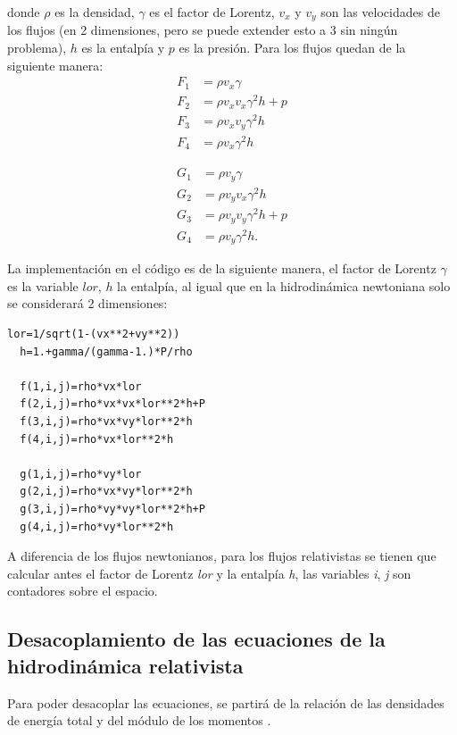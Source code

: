 \documentclass[12pt,a4paper]{book}
\begin{document}
\noindent donde $\rho$ es la densidad, $\gamma$ es el factor de Lorentz, $v_{x}$ y $v_{y}$ son las velocidades de los flujos (en 2 dimensiones, pero se puede extender esto a 3 sin ningún problema), 
$h$ es la entalpía  y $p$ es la presión. Para los flujos quedan de la siguiente manera:
\begin{align}
F_{1}& = \rho v_{x} \gamma \\ 
F_{2}& = \rho v_{x} v_{x} \gamma^{2} h + p\\ 
F_{3}& = \rho v_{x} v_{y} \gamma^{2} h \\ 
F_{4}& = \rho v_{x} \gamma^{2} h 
\end{align}

\begin{align}
G_{1}& = \rho v_{y} \gamma \\ 
G_{2}& = \rho v_{y} v_{x} \gamma^{2} h \\ 
G_{3}& = \rho v_{y} v_{y} \gamma^{2} h + p\\ 
G_{4}& = \rho v_{y} \gamma^{2} h .
\end{align}


La implementación en el código es de la siguiente manera, el factor de Lorentz $\gamma$ es la variable $lor$, $h$ la entalpía, al igual que en la hidrodinámica newtoniana solo se considerará 2 dimensiones:

\begin{lstlisting}[frame=single]
  lor=1/sqrt(1-(vx**2+vy**2))
  h=1.+gamma/(gamma-1.)*P/rho
  
  f(1,i,j)=rho*vx*lor
  f(2,i,j)=rho*vx*vx*lor**2*h+P
  f(3,i,j)=rho*vx*vy*lor**2*h
  f(4,i,j)=rho*vx*lor**2*h

  g(1,i,j)=rho*vy*lor
  g(2,i,j)=rho*vx*vy*lor**2*h
  g(3,i,j)=rho*vy*vy*lor**2*h+P
  g(4,i,j)=rho*vy*lor**2*h

\end{lstlisting}

A diferencia de los flujos newtonianos, para los flujos relativistas se tienen que calcular antes el factor de Lorentz \emph{lor} y la entalpía \emph{h},
las variables \emph{i}, \emph{j} son contadores sobre el espacio.

\subsection{Desacoplamiento de las ecuaciones de la hidrodinámica relativista} \label{Cap_Desacoplamiento_de_las_ecuaciones_de_la_hidrodinámica_relativista}
Para poder desacoplar las ecuaciones, se partirá de la relación de las densidades de energía total y del módulo de los momentos \citep{McKinney2007}. 
\end{document}
